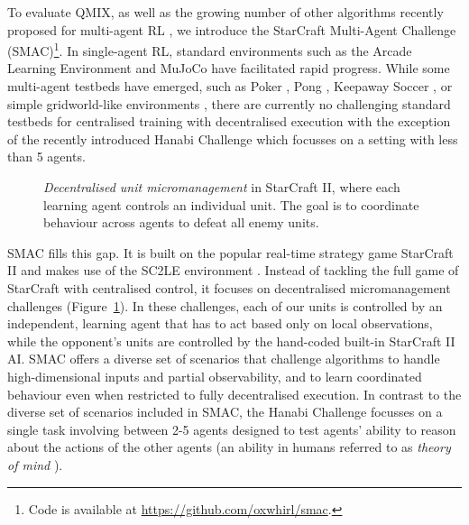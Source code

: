 \documentclass[twoside,11pt]{article}
\renewcommand{\cite}{\citep}
\begin{document}
To evaluate QMIX, as well as the growing number of other algorithms recently proposed for multi-agent RL \cite{foerster_counterfactual_2017, sunehag_value-decomposition_2017}, we introduce the StarCraft Multi-Agent Challenge (SMAC)\footnote{Code is available at \url{https://github.com/oxwhirl/smac}.}.  In single-agent RL, standard environments such as the Arcade Learning Environment \cite{bellemare13arcade} and MuJoCo \cite{Plappert2019multigoal} have facilitated rapid progress.  While some multi-agent testbeds have emerged, such as Poker \cite{HeinrichS16}, Pong \cite{tampuu_multiagent_2015}, Keepaway Soccer \cite{stone2005keepaway}, or simple gridworld-like environments \cite{lowe_multi-agent_2017, leibo_multi-agent_2017, yang2018mean, zheng2017magent}, there are currently no challenging standard testbeds for centralised training with decentralised execution with the exception of the recently introduced Hanabi Challenge \citep{bard2020Hanabi} which focusses on a setting with less than 5 agents.

\begin{figure}[t!]
	\centering
	\caption{\textit{Decentralised unit micromanagement} in StarCraft II, where each learning agent controls an individual unit. The goal is to coordinate behaviour across agents to defeat all enemy units.}
	\label{fig:starcraft_screenshots}
\end{figure}

SMAC fills this gap. It is built on the popular real-time strategy game StarCraft II and makes use of the SC2LE environment \cite{vinyals_starcraft_2017}.
Instead of tackling the full game of StarCraft with centralised control, it focuses on decentralised micromanagement challenges (Figure~\ref{fig:starcraft_screenshots}).
In these challenges, each of our units is controlled by an independent, learning agent that has to act based only on local observations, while the opponent's units are controlled by the hand-coded built-in StarCraft II AI.
SMAC offers a diverse set of scenarios that challenge algorithms to handle high-dimensional inputs and partial observability, and to learn coordinated 
behaviour even when restricted to fully decentralised execution.
In contrast to the diverse set of scenarios included in SMAC, the Hanabi Challenge focusses on a single task involving between 2-5 agents designed to test agents' ability to reason about the actions of the other agents (an ability in humans referred to as \textit{theory of mind} \citep{rabinowitz2018machine}).
\end{document}
